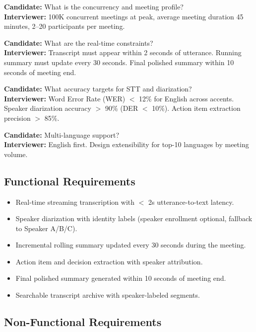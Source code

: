 \textbf{Candidate:} What is the concurrency and meeting profile?\\
\textbf{Interviewer:} 100K concurrent meetings at peak, average meeting duration 45 minutes, 2--20 participants per meeting.

\textbf{Candidate:} What are the real-time constraints?\\
\textbf{Interviewer:} Transcript must appear within 2 seconds of utterance. Running summary must update every 30 seconds. Final polished summary within 10 seconds of meeting end.

\textbf{Candidate:} What accuracy targets for STT and diarization?\\
\textbf{Interviewer:} Word Error Rate (WER) $<$ 12\% for English across accents. Speaker diarization accuracy $>$ 90\% (DER $<$ 10\%). Action item extraction precision $>$ 85\%.

\textbf{Candidate:} Multi-language support?\\
\textbf{Interviewer:} English first. Design extensibility for top-10 languages by meeting volume.

\subsection*{Functional Requirements}

\begin{itemize}
  \item Real-time streaming transcription with $<$ 2s utterance-to-text latency.
  \item Speaker diarization with identity labels (speaker enrollment optional, fallback to Speaker A/B/C).
  \item Incremental rolling summary updated every 30 seconds during the meeting.
  \item Action item and decision extraction with speaker attribution.
  \item Final polished summary generated within 10 seconds of meeting end.
  \item Searchable transcript archive with speaker-labeled segments.
\end{itemize}

\subsection*{Non-Functional Requirements}

